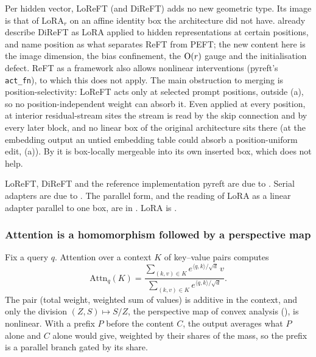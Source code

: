 \begin{explains}
Per hidden vector, LoReFT (and DiReFT) adds no new geometric type. Its image is that of LoRA$_r$ on an affine identity
box the architecture did not have. \citet{wu2024reft} already describe DiReFT as LoRA applied to hidden representations
at certain positions, and name position as what separates ReFT from PEFT; the new content here is the image dimension,
the bias confinement, the $\mathrm{O}(r)$ gauge and the initialisation defect. ReFT as a framework also allows nonlinear
interventions (pyreft's \texttt{act\_fn}), to which this does not apply. The main obstruction to merging is
position-selectivity: LoReFT acts only at selected prompt positions, outside (a), so no
position-independent weight can absorb it. Even applied at every position, at interior residual-stream sites the stream
is read by the skip connection and by every later block, and no linear box of the original architecture sits there (at
the embedding output an untied embedding table could absorb a position-uniform edit, (a)). By
 it is box-locally mergeable into its own inserted box, which does not help.
\end{explains}

LoReFT, DiReFT and the reference implementation pyreft are due to \citet{wu2024reft}. Serial adapters are due to
\citet{houlsby2019parameter}. The parallel form, and the reading of LoRA as a linear adapter parallel to one box, are in
\citet{he2021unified}. LoRA is \citet{hu2021lora}.

\subsubsection{Attention is a homomorphism followed by a perspective map}\label{sec:merge-attention}

Fix a query $q$. Attention over a context $K$ of key--value pairs computes
\begin{equation}\label{eq:merge-attn}
  \mathrm{Attn}_q(K)=\frac{\sum_{(k,v)\in K}e^{\langle q,k\rangle/\sqrt d}\,v}{\sum_{(k,v)\in K}e^{\langle q,k\rangle/\sqrt d}}.
\end{equation}
The pair (total weight, weighted sum of values) is additive in the context, and only the division $(Z,S)\mapsto S/Z$, the
perspective map of convex analysis (), is nonlinear. With a prefix $P$ before the content $C$, the output
averages what $P$ alone and $C$ alone would give, weighted by their shares of the mass, so the prefix is a parallel
branch gated by its share.

